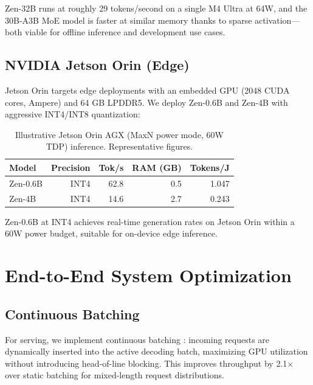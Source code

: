 \documentclass[11pt,a4paper]{article}
\begin{document}
Zen-32B runs at roughly 29 tokens/second on a single M4 Ultra at 64W, and the 30B-A3B
MoE model is faster at similar memory thanks to sparse activation---both viable for
offline inference and development use cases.

\subsection{NVIDIA Jetson Orin (Edge)}

Jetson Orin targets edge deployments with an embedded GPU (2048 CUDA cores, Ampere)
and 64 GB LPDDR5. We deploy Zen-0.6B and Zen-4B with aggressive INT4/INT8 quantization:

\begin{table}[H]
\centering
\caption{Illustrative Jetson Orin AGX (MaxN power mode, 60W TDP) inference. Representative figures.}
\begin{tabular}{lrrrr}
\toprule
\textbf{Model} & \textbf{Precision} & \textbf{Tok/s} & \textbf{RAM (GB)} & \textbf{Tokens/J} \\
\midrule
Zen-0.6B & INT4 & 62.8 & 0.5 & 1.047 \\
Zen-4B   & INT4 & 14.6 & 2.7 & 0.243 \\
\bottomrule
\end{tabular}
\label{tab:jetson}
\end{table}

Zen-0.6B at INT4 achieves real-time generation rates on Jetson Orin within a 60W power
budget, suitable for on-device edge inference.

\section{End-to-End System Optimization}
\label{sec:system}

\subsection{Continuous Batching}

For serving, we implement continuous batching \cite{yu2022orca}: incoming requests
are dynamically inserted into the active decoding batch, maximizing GPU utilization
without introducing head-of-line blocking. This improves throughput by 2.1$\times$
over static batching for mixed-length request distributions.
\end{document}
